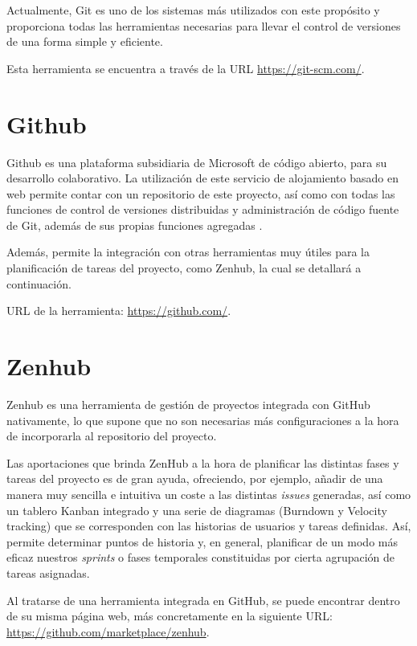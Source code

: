 Actualmente, Git es uno de los sistemas más utilizados con este propósito y proporciona todas las herramientas necesarias para llevar el
control de versiones de una forma simple y eficiente.

Esta herramienta se encuentra a través de la URL \url{https://git-scm.com/}.


\section{Github}

Github es una plataforma subsidiaria de Microsoft de código abierto, para su desarrollo colaborativo. La utilización de este servicio de alojamiento basado en web permite contar con un repositorio de este proyecto, así como con todas las funciones de control de versiones distribuidas y administración de código fuente de Git, además de sus propias funciones agregadas \cite{wiki:github}.

Además, permite la integración con otras herramientas muy útiles para la planificación de tareas del proyecto, como Zenhub, la cual se detallará a continuación.

URL de la herramienta: \url{https://github.com/}.


\section{Zenhub}

Zenhub es una herramienta de gestión de proyectos integrada con GitHub nativamente, lo que supone que no son necesarias más configuraciones a la hora de incorporarla al repositorio del proyecto.

Las aportaciones que brinda ZenHub a la hora de planificar las distintas fases y tareas del proyecto es de gran ayuda, ofreciendo, por ejemplo, añadir de una manera muy sencilla e intuitiva un coste a las distintas \textit{issues} generadas, así como un tablero Kanban integrado y una serie de diagramas (Burndown y Velocity tracking) que se corresponden con las historias de usuarios y tareas definidas. Así, permite determinar puntos de historia y, en general, planificar de un modo más eficaz nuestros \textit{sprints} o fases temporales constituidas por cierta agrupación de tareas asignadas.

Al tratarse de una herramienta integrada en GitHub, se puede encontrar dentro de su misma página web, más concretamente en la siguiente URL: \url{https://github.com/marketplace/zenhub}.


